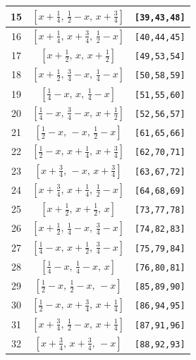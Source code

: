 \documentclass[fleqn,8pt]{jsarticle}
\begin{document}
\begin{longtable}{ccc}
15 & $\left[ x + \frac{1}{4},\, \frac{1}{2} - x,\, x + \frac{3}{4} \right]$ & {\tt [39,43,48]} \\ \hline
16 & $\left[ x + \frac{1}{4},\, x + \frac{3}{4},\, \frac{1}{2} - x \right]$ & {\tt [40,44,45]} \\ \hline
17 & $\left[ x + \frac{1}{2},\, x,\, x + \frac{1}{2} \right]$ & {\tt [49,53,54]} \\ \hline
18 & $\left[ x + \frac{1}{2},\, \frac{3}{4} - x,\, \frac{1}{4} - x \right]$ & {\tt [50,58,59]} \\ \hline
19 & $\left[ \frac{1}{4} - x,\, x,\, \frac{1}{4} - x \right]$ & {\tt [51,55,60]} \\ \hline
20 & $\left[ \frac{1}{4} - x,\, \frac{3}{4} - x,\, x + \frac{1}{2} \right]$ & {\tt [52,56,57]} \\ \hline
21 & $\left[ \frac{1}{2} - x,\, - x,\, \frac{1}{2} - x \right]$ & {\tt [61,65,66]} \\ \hline
22 & $\left[ \frac{1}{2} - x,\, x + \frac{1}{4},\, x + \frac{3}{4} \right]$ & {\tt [62,70,71]} \\ \hline
23 & $\left[ x + \frac{3}{4},\, - x,\, x + \frac{3}{4} \right]$ & {\tt [63,67,72]} \\ \hline
24 & $\left[ x + \frac{3}{4},\, x + \frac{1}{4},\, \frac{1}{2} - x \right]$ & {\tt [64,68,69]} \\ \hline
25 & $\left[ x + \frac{1}{2},\, x + \frac{1}{2},\, x \right]$ & {\tt [73,77,78]} \\ \hline
26 & $\left[ x + \frac{1}{2},\, \frac{1}{4} - x,\, \frac{3}{4} - x \right]$ & {\tt [74,82,83]} \\ \hline
27 & $\left[ \frac{1}{4} - x,\, x + \frac{1}{2},\, \frac{3}{4} - x \right]$ & {\tt [75,79,84]} \\ \hline
28 & $\left[ \frac{1}{4} - x,\, \frac{1}{4} - x,\, x \right]$ & {\tt [76,80,81]} \\ \hline
29 & $\left[ \frac{1}{2} - x,\, \frac{1}{2} - x,\, - x \right]$ & {\tt [85,89,90]} \\ \hline
30 & $\left[ \frac{1}{2} - x,\, x + \frac{3}{4},\, x + \frac{1}{4} \right]$ & {\tt [86,94,95]} \\ \hline
31 & $\left[ x + \frac{3}{4},\, \frac{1}{2} - x,\, x + \frac{1}{4} \right]$ & {\tt [87,91,96]} \\ \hline
32 & $\left[ x + \frac{3}{4},\, x + \frac{3}{4},\, - x \right]$ & {\tt [88,92,93]} \\
\end{longtable}
\renewcommand{\arraystretch}{1.2}
\end{document}
